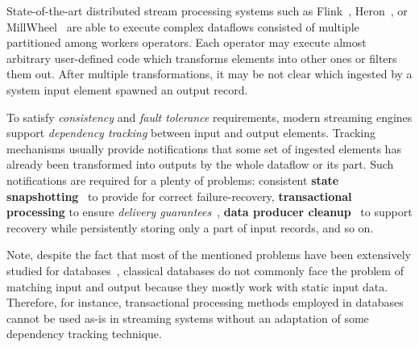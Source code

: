 \label {fs-acker-intro}



State-of-the-art distributed stream processing systems such as Flink~\cite{Carbone:2017:SMA:3137765.3137777}, Heron~\cite{Kulkarni:2015:THS:2723372.2742788}, or MillWheel~\cite{Akidau:2013:MFS:2536222.2536229} are able to execute complex dataflows consisted of multiple partitioned among workers operators. Each operator may execute almost arbitrary user-defined code which transforms elements into other ones or filters them out. After multiple transformations, it may be not clear which ingested by a system input element spawned an output record. 

To satisfy {\em consistency} and {\em fault tolerance} requirements, modern streaming engines support {\em dependency tracking} between input and output elements. Tracking mechanisms usually provide notifications that some set of ingested elements has already been transformed into outputs by the whole dataflow or its part. Such notifications are required for a plenty of problems: consistent {\bf state snapshotting}~\cite{Akidau:2013:MFS:2536222.2536229, 2015arXiv150608603C} to provide for correct failure-recovery, {\bf transactional processing} to ensure {\em delivery guarantees}~\cite{thepaper, Carbone:2017:SMA:3137765.3137777}, {\bf data producer cleanup}~\cite{Noghabi:2017:SSS:3137765.3137770} to support recovery while persistently storing only a part of input records, and so on. 

Note, despite the fact that most of the mentioned problems have been extensively studied for databases~\cite{DBLP:books/mk/WeikumV2002}, classical databases do not commonly face the problem of matching input and output because they mostly work with static input data. Therefore, for instance, transactional processing methods employed in databases cannot be used as-is in streaming systems without an adaptation of some dependency tracking technique.


